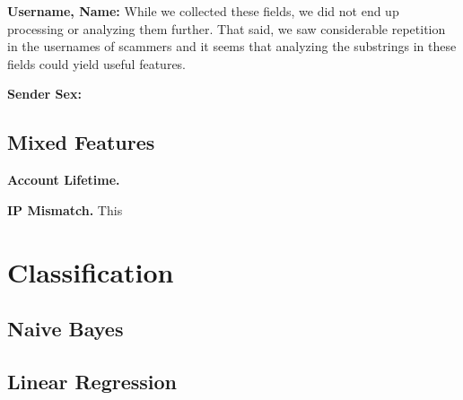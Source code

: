 \documentclass[preprint]{acm_proc_article-sp}
\begin{document}
\textbf{Username, Name:} While we collected these fields, we did not end up processing or analyzing them further. That said, we saw considerable repetition in the usernames of scammers and it seems that analyzing the substrings in these fields could yield useful features.

\textbf{Sender Sex:}

\subsection{Mixed Features}

\textbf{Account Lifetime.}

\textbf{IP Mismatch.} This 




\section{Classification}

\subsection{Naive Bayes}

%
%
\subsection{Linear Regression}
\end{document}
